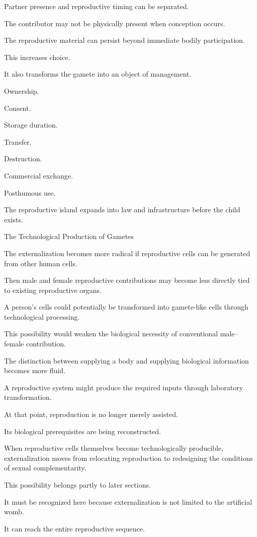 Partner presence and reproductive timing can be separated.

The contributor may not be physically present when conception occurs.

The reproductive material can persist beyond immediate bodily participation.

This increases choice.

It also transforms the gamete into an object of management.

Ownership.

Consent.

Storage duration.

Transfer.

Destruction.

Commercial exchange.

Posthumous use.

The reproductive island expands into law and infrastructure before the child exists.

The Technological Production of Gametes

The externalization becomes more radical if reproductive cells can be generated from other human cells.

Then male and female reproductive contributions may become less directly tied to existing reproductive organs.

A person’s cells could potentially be transformed into gamete-like cells through technological processing.

This possibility would weaken the biological necessity of conventional male–female contribution.

The distinction between supplying a body and supplying biological information becomes more fluid.

A reproductive system might produce the required inputs through laboratory transformation.

At that point, reproduction is no longer merely assisted.

Its biological prerequisites are being reconstructed.

When reproductive cells themselves become technologically producible, externalization moves from relocating reproduction to redesigning the conditions of sexual complementarity.

This possibility belongs partly to later sections.

It must be recognized here because externalization is not limited to the artificial womb.

It can reach the entire reproductive sequence.

